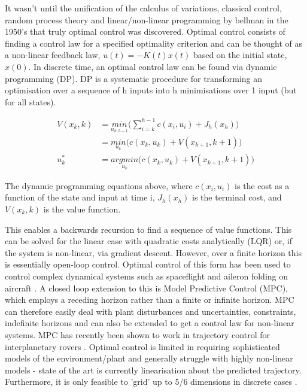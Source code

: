 \documentclass[main.tex]{subfiles}
\begin{document}
It wasn't until the unification of the calculus of variations, classical control, random process theory and linear/non-linear programming by bellman in the 1950's \cite{History} that truly optimal control was discovered. Optimal control consists of finding a control law for a specified optimality criterion and can be thought of as a non-linear feedback law, $u(t) = -K(t)x(t)$ based on the initial state, $x(0)$. In discrete time, an optimal control law can be found via dynamic programming (DP). DP is a systematic procedure for transforming an optimisation over a sequence of h inputs into h minimisations over 1 input (but for all states).

\begin{align}
    \label{equ:detval} 
    V(x_k, k) & = \underset{u_{k:h-1}}{min} \bigg( \sum_{i=k}^{h-1} c(x_i, u_i) + J_h(x_h) \bigg) \\ 
    & = \underset{u_k}{min} \Big( c(x_k, u_k) + V(x_{k+1}, k+1) \Big) \\
    u^{*}_k & = \underset{u_k}{argmin} \Big( c(x_k, u_k) + V(x_{k+1}, k+1) \Big)
\end{align}

The dynamic programming equations above, where $c(x_i, u_i)$ is the cost as a function of the state and input at time i, $J_h(x_h)$ is the terminal cost, and $V(x_k, k)$ is the value function.

This enables a backwards recursion to find a sequence of value functions. This can be solved for the linear case with quadratic costs analytically (LQR) or, if the system is non-linear, via gradient descent. However, over a finite horizon this is essentially open-loop control. Optimal control of this form has been used to control complex dynamical systems such as spaceflight and aileron folding on aircraft \cite{aircraftoptcont, aileronoptcont}. A closed loop extension to this is Model Predictive Control (MPC), which employs a receding horizon rather than a finite or infinite horizon. MPC can therefore easily deal with plant disturbances and uncertainties, constraints, indefinite horizons and can also be extended to get a control law for non-linear systems. MPC has recently been shown to work in trajectory control for interplanetary rovers \cite{rovermpc}. Optimal control is limited in requiring sophisticated models of the environment/plant and generally struggle with highly non-linear models - state of the art is currently linearisation about the predicted trajectory. Furthermore, it is only feasible to 'grid' up to 5/6 dimensions in discrete cases \cite{4f3}. 
\end{document}

